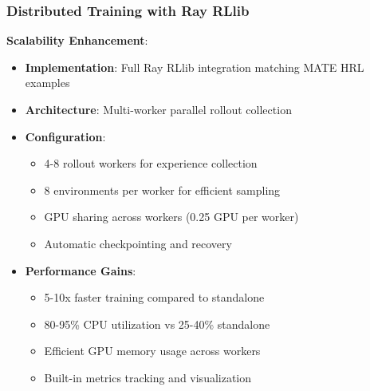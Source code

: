 \documentclass[12pt,a4paper]{report}
\begin{document}
\subsubsection{Distributed Training with Ray RLlib}
\textbf{Scalability Enhancement}:
\begin{itemize}
\item \textbf{Implementation}: Full Ray RLlib integration matching MATE HRL examples
\item \textbf{Architecture}: Multi-worker parallel rollout collection
\item \textbf{Configuration}:
\begin{itemize}
\item 4-8 rollout workers for experience collection
\item 8 environments per worker for efficient sampling
\item GPU sharing across workers (0.25 GPU per worker)
\item Automatic checkpointing and recovery
\end{itemize}
\item \textbf{Performance Gains}:
\begin{itemize}
\item 5-10x faster training compared to standalone
\item 80-95\% CPU utilization vs 25-40\% standalone
\item Efficient GPU memory usage across workers
\item Built-in metrics tracking and visualization
\end{itemize}
\end{itemize}
\end{document}
